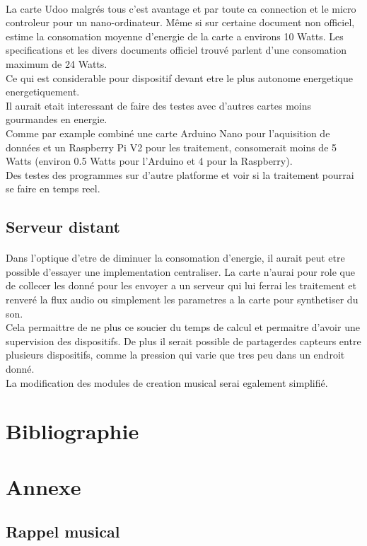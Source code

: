 \documentclass[a4paper, titlepage, oneside, 12pt]{article}%
\begin{document}
\paragraph{}
La carte Udoo malgrés tous c'est avantage et par toute ca connection et le micro controleur pour un nano-ordinateur. Même si sur certaine document non officiel, estime la consomation moyenne d'energie de la carte a environs 10 Watts. Les specifications et les divers documents officiel trouvé parlent d'une consomation maximum de 24 Watts.\\
Ce qui est considerable pour dispositif devant etre le plus autonome energetique energetiquement.\\
Il aurait etait interessant de faire des testes avec d'autres cartes moins gourmandes en energie.\\
Comme par example combiné une carte Arduino Nano pour l'aquisition de données et un Raspberry Pi V2 pour les traitement, consomerait moins de 5 Watts (environ  0.5 Watts pour l'Arduino et 4 pour la Raspberry).\\
Des testes des programmes sur d'autre platforme et voir si la traitement pourrai se faire en temps reel.

\subsection{Serveur distant}
\paragraph{}
Dans l'optique d'etre de diminuer la consomation d'energie, il aurait peut etre possible d'essayer une implementation centraliser. La carte n'aurai pour role que de collecer les donné pour les envoyer a un serveur qui lui ferrai les traitement et renveré la flux audio ou simplement les parametres a la carte pour synthetiser du son.\\
Cela permaittre de ne plus ce soucier du temps de calcul et permaitre d'avoir une supervision des dispositifs. De plus il serait possible de partagerdes capteurs entre plusieurs dispositifs, comme la pression qui varie que tres peu dans un endroit donné.\\
La modification des modules de creation musical serai egalement simplifié.
 

\newpage
\section{Bibliographie}
\nocite{*}



\newpage\section{Annexe}
\subsection{Rappel musical}
\end{document}
